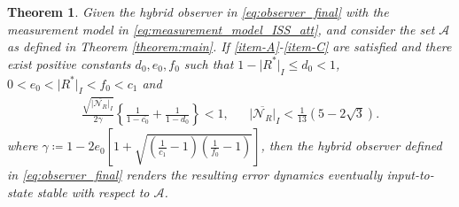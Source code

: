\documentclass{article}
\newtheorem{theorem}{Theorem}
\newcommand{\brackets}[1]{\left(#1\right)}
\newcommand{\normSOthree}[1]{{{\vert}#1 {\vert}_I}}
\newcommand{\Rstar}{{R^*}}
\newcommand{\noiseatt}{\mathcal{N}_R}
\newcommand{\maxnoiseatt}{\normSOthree{\overline{\noiseatt}}}
\newcommand{\cobar}{\overline{c_0}}
\begin{document}
\begin{theorem}
    Given the hybrid observer in \eqref{eq:observer_final} with the measurement model in \eqref{eq:measurement_model_ISS_att}, and consider the set $\mathcal{A}$ as defined in Theorem \ref{theorem:main}. If \ref{item-A}-\ref{item-C} are satisfied and there exist positive constants $d_0, e_0, f_0$ such that $1 - \normSOthree{\Rstar}\leq d_0 < 1$, $0 < e_0 < \normSOthree{\Rstar} < f_0 < c_1$ and
    \begin{align*}
        \frac{\sqrt{\maxnoiseatt}}{2\gamma}\left\{\frac{1}{1-\cobar}+\frac{1}{1-{d_0}}\right\} < 1, && \maxnoiseatt < \frac{1}{13}\brackets{5 - 2\sqrt{3}}.
    \end{align*}
    where $\gamma \coloneqq {1 - 2e_0\left[1 + \sqrt{\brackets{\frac{1}{c_1}-1}\brackets{\frac{1}{f_0}-1}}\right]}$, then the hybrid observer defined in \eqref{eq:observer_final} renders the resulting error dynamics {eventually input-to-state stable} with respect to $\mathcal{A}$.
\end{theorem}
\end{document}
